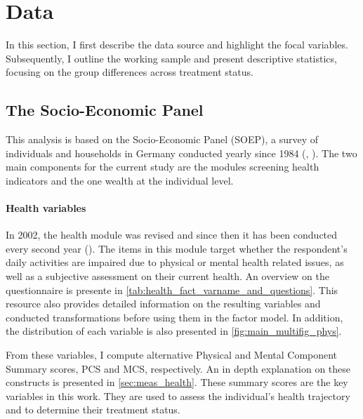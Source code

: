 



\chapter{Data}
\label{chap:data}

In this section, I first describe the data source and highlight the focal variables. Subsequently, I outline the working sample and present descriptive statistics, focusing on the group differences across treatment status.

\section{The Socio-Economic Panel}
\label{sec:soep}

This analysis is based on the Socio-Economic Panel (SOEP), a survey of individuals and households in Germany conducted yearly since 1984 (\cite{goebel.etal2019SOEP}, \cite{liebig.etal2022SOEP}). The two main components for the current study are the modules screening health indicators 
and the one wealth at the individual level.  


\subsubsection{Health variables} In 2002, the health module was revised and since then it has been conducted every
second year (\cite{grabka2022healthv37}). The items in this module target whether the respondent's daily activities
are impaired due to physical or mental health related issues, as well as a subjective assessment on their current
health. An overview on the questionnaire is presente in \cref{tab:health_fact_varname_and_questions}. This resource
also provides detailed information on the resulting variables and conducted transformations before using them in
the factor model. In addition, the distribution of each variable is also presented in
\cref{fig:main_multifig_phys}.
 
From these variables, I compute alternative Physical and Mental Component Summary scores, PCS and MCS,
respectively. An in depth explanation on these constructs is presented in \cref{sec:meas_health}. These summary
scores are the key variables in this work. They are used to assess the individual's health trajectory and to
determine their treatment status.


